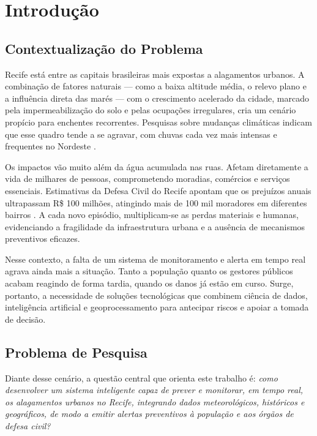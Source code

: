 \chapter{Introdução}

\section{Contextualização do Problema}

Recife está entre as capitais brasileiras mais expostas a alagamentos urbanos. A combinação de fatores naturais — como a baixa altitude média, o relevo plano e a influência direta das marés — com o crescimento acelerado da cidade, marcado pela impermeabilização do solo e pelas ocupações irregulares, cria um cenário propício para enchentes recorrentes. Pesquisas sobre mudanças climáticas indicam que esse quadro tende a se agravar, com chuvas cada vez mais intensas e frequentes no Nordeste \cite{marengo2009mudancas}.  

Os impactos vão muito além da água acumulada nas ruas. Afetam diretamente a vida de milhares de pessoas, comprometendo moradias, comércios e serviços essenciais. Estimativas da Defesa Civil do Recife apontam que os prejuízos anuais ultrapassam R\$ 100 milhões, atingindo mais de 100 mil moradores em diferentes bairros \cite{defesacivil2023relatorio}. A cada novo episódio, multiplicam-se as perdas materiais e humanas, evidenciando a fragilidade da infraestrutura urbana e a ausência de mecanismos preventivos eficazes.  

Nesse contexto, a falta de um sistema de monitoramento e alerta em tempo real agrava ainda mais a situação. Tanto a população quanto os gestores públicos acabam reagindo de forma tardia, quando os danos já estão em curso. Surge, portanto, a necessidade de soluções tecnológicas que combinem ciência de dados, inteligência artificial e geoprocessamento para antecipar riscos e apoiar a tomada de decisão.

\section{Problema de Pesquisa}

Diante desse cenário, a questão central que orienta este trabalho é: \textit{como desenvolver um sistema inteligente capaz de prever e monitorar, em tempo real, os alagamentos urbanos no Recife, integrando dados meteorológicos, históricos e geográficos, de modo a emitir alertas preventivos à população e aos órgãos de defesa civil?}

